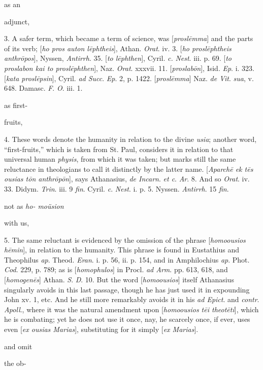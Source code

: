 as an

adjunct,

3. A safer term, which
became a term of science, was [\emph{prosl\={e}mma}] and
the parts of its verb; [\emph{ho pros auton l\={e}phtheis}],
Athan. \emph{Orat}. iv. 3. [\emph{ho prosl\={e}phtheis
anthr\={o}pos}], Nyssen, \emph{Antirrh}. 35. [\emph{to
l\={e}phthen}], Cyril. \emph{c.} \emph{Nest}. iii. p. 69.
[\emph{to proslabon kai to prosl\={e}phthen}], Naz. \emph{Orat}.
xxxvii. 11. [\emph{proslab\={o}n}], Isid. \emph{Ep}. i.
323. [\emph{kata prosl\={e}psin}], Cyril. \emph{ad Succ}. \emph{Ep}.
2, p. 1422. [\emph{prosl\={e}mma}] Naz. \emph{de Vit}. \emph{sua},
v. 648. Damasc. \emph{F}. \emph{O}. iii. 1.

as first-

fruits,

4. These words denote
the humanity in relation to the divine \emph{usia}; another
word, ``first-fruits,'' which is taken from St. Paul, considers
it in relation to that universal human \emph{physis}, from
which it was taken; but marks still the same reluctance in
theologians to call it distinctly by the latter name. [\emph{Aparch\={e}
ek t\={e}s ousias t\={o}n anthr\={o}p\={o}n}],
says Athanasius, \emph{de Incarn}. \emph{et c}. \emph{Ar}. 8.
And so \emph{Orat}. iv. 33. Didym. \emph{Trin}. iii. 9 \emph{fin}.
Cyril. \emph{c}. \emph{Nest}. i. p. 5. Nyssen. \emph{Antirrh}.
15 \emph{fin}.

not as \emph{ho- moüsion}

with us,

5. The same reluctant is
evidenced by the omission of the phrase [\emph{homoousios h\={e}min}],
in relation to the humanity. This phrase is found in
Eustathius and Theophilus \emph{ap}. Theod. \emph{Eran}. i. p.
56, ii. p. 154, and in Amphilochius \emph{ap}. Phot. \emph{Cod}.
229, p. 789; as is [\emph{homophulos}] in Procl. \emph{ad Arm}.
pp. 613, 618, and [\emph{homogen\={e}s}] Athan. \emph{S}. \emph{D}.
10. But the word [\emph{homoousios}] itself Athanasius
singularly avoids in this last passage, though he has just
used it in expounding John xv. 1, etc. And he still more
remarkably avoids it in his \emph{ad Epict}. and \emph{contr}.
\emph{Apoll}., where it was the natural amendment upon [\emph{homoousios
t\={e}i theot\={e}ti}], which he is combating; yet he
does not use it once, nay, he scarcely once, if ever, uses
even [\emph{ex ousias Marias}], substituting for it simply [\emph{ex
Marias}].

and omit

the ob-

